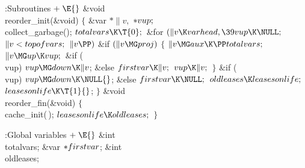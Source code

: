 \Y\B\4:Subroutines\X${}\mathrel+\E{}$\6
\&{void} \\{reorder\_init}(\&{void})\1\1\2\2\6
${}\{{}$\1\6
\&{var} ${}{*}\|v,{}$ ${}{*}\\{vup};{}$\7
\\{collect\_garbage}();\6
${}\\{totalvars}\K\T{0};{}$\6
\&{for} ${}(\|v\K\\{varhead},\39\\{vup}\K\NULL;{}$ ${}\|v<\\{topofvars};{}$ ${}%
\|v\PP){}$\1\6
\&{if} ${}(\|v\MG\\{proj}){}$\5
${}\{{}$\1\6
${}\|v\MG\\{aux}\K\PP\\{totalvars};{}$\6
${}\|v\MG\\{up}\K\\{vup};{}$\6
\&{if} (\\{vup})\1\5
${}\\{vup}\MG\\{down}\K\|v{}$;\5
\2\&{else}\1\5
${}\\{firstvar}\K\|v;{}$\2\6
${}\\{vup}\K\|v;{}$\6
\4${}\}{}$\2\2\6
\&{if} (\\{vup})\1\5
${}\\{vup}\MG\\{down}\K\NULL{}$;\5
\2\&{else}\1\5
${}\\{firstvar}\K\NULL;{}$\2\6
${}\\{oldleases}\K\\{leasesonlife};{}$\6
${}\\{leasesonlife}\K\T{1}{}$;\6
\4${}\}{}$\2\7
\&{void} \\{reorder\_fin}(\&{void})\1\1\2\2\6
${}\{{}$\1\6
\\{cache\_init}(\,);\6
${}\\{leasesonlife}\K\\{oldleases};{}$\6
\4${}\}{}$\2\par
\fi

\B{}:Global variables\X${}\mathrel+\E{}$\6
\&{int} \\{totalvars};\6
\&{var} ${}{*}\\{firstvar}{}$;\6
\&{int} \\{oldleases};\par
\fi

